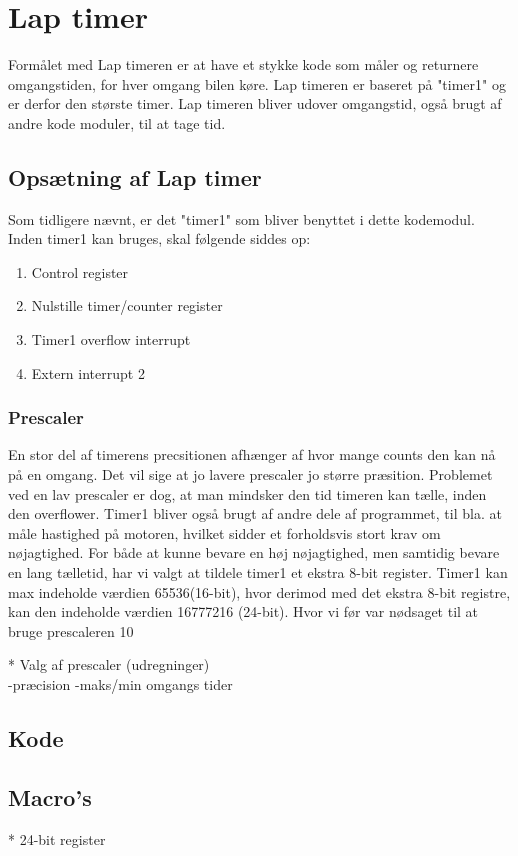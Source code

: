 \newpage
\section{Lap timer}
Formålet med Lap timeren er at have et stykke kode som måler og returnere omgangstiden, for hver omgang bilen køre. Lap timeren er baseret på "timer1" og er derfor den største timer. Lap timeren bliver udover omgangstid, også brugt af andre kode moduler, til at tage tid.
\subsection{Opsætning af Lap timer}
Som tidligere nævnt, er det "timer1" som bliver benyttet i dette kodemodul. Inden timer1 kan bruges, skal følgende siddes op:
\begin{enumerate}
\item Control register
\item Nulstille timer/counter register
\item Timer1 overflow interrupt
\item Extern interrupt 2 
\end{enumerate}

\subsubsection{Prescaler}
En stor del af timerens precsitionen afhænger af hvor mange counts den kan nå på en omgang. Det vil sige at jo lavere prescaler jo større præsition. Problemet ved en lav prescaler er dog, at man mindsker den tid timeren kan tælle, inden den overflower. Timer1 bliver også brugt af andre dele af programmet, til bla. at måle hastighed på motoren, hvilket sidder et forholdsvis stort krav om nøjagtighed. For både at kunne bevare en høj nøjagtighed, men samtidig bevare en lang tælletid, har vi valgt at tildele timer1 et ekstra 8-bit register. Timer1 kan max indeholde værdien 65536(16-bit), hvor derimod med det ekstra 8-bit registre, kan den indeholde værdien 16777216 (24-bit). Hvor vi før var nødsaget til at bruge prescaleren 10





* Valg af prescaler (udregninger)\\
	-præcision
	-maks/min omgangs tider 


\subsection{Kode}
\subsection{Macro's}


	
* 24-bit register\\